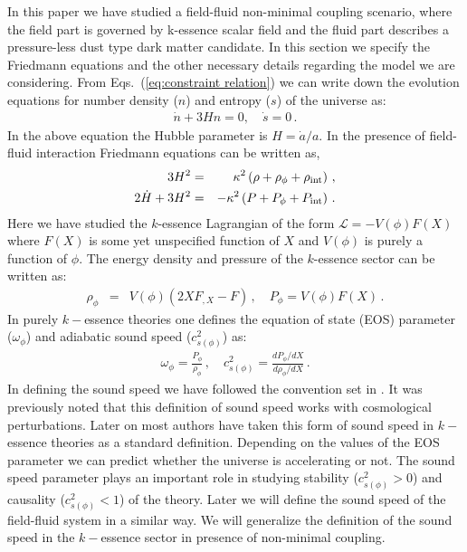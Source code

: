 \documentclass[a4paper,12pt]{article}
\begin{document}
In this paper we have studied a field-fluid non-minimal coupling scenario, where the field part is governed by k-essence scalar field and the fluid part describes a  pressure-less dust type dark matter candidate.  In this section we specify the Friedmann equations and the other necessary details regarding the model we are considering. From Eqs.~(\ref{eq:constraint relation}) we can write down the evolution equations for number density ($n$) and entropy ($s$) of the universe as:
%
\begin{eqnarray}
\dot{n}+3Hn = 0,\quad  \dot{s}=0\,.
\end{eqnarray}
%
In the above equation the Hubble parameter is $H=\dot{a}/a$. In the presence of field-fluid interaction Friedmann equations can be written as,
\begin{eqnarray}
  3H^2 &=& \kappa^2 \left(\rho+\rho_{\phi}+\rho_{\rm int}\right)\,,
\label{frd1}\\
2\dot{H}+3H^2 &=& -\kappa^2 \left(P+P_{\phi}+P_{\rm int}\right)\,.
\label{eq:F1}
\end{eqnarray}
%
Here we have studied the $k$-essence Lagrangian of the form  ${\mathcal L}=-V(\phi)F(X)$ where $F(X)$ is some yet unspecified function of $X$ and $V(\phi)$ is purely a function of $\phi$. The energy density and pressure of the $k$-essence sector can be written as:
\begin{eqnarray}
\rho_{\phi} &=& V(\phi)(2XF_{,X}-F)\,,\quad P_{\phi}=V(\phi)F(X)\,.
\label{eq:F2}
\end{eqnarray}
%
In purely $k-$essence theories one defines the equation of state (EOS) parameter ($\omega_\phi$) and adiabatic sound speed ($c_{s(\phi)}^2$) as:
\begin{eqnarray}
\omega_\phi = \frac{P_{\phi}}{\rho_{\phi}}\,,\quad c_{s(\phi)}^2 = \frac{dP_\phi/dX}{d\rho_\phi/dX}\,.
\label{eq:F3}
\end{eqnarray}
%
In defining the sound speed we have followed the convention set in \cite{Garriga:1999vw, Scherrer:2004au}. It was previously noted that this definition of sound speed works with cosmological perturbations. Later on most authors have taken this form of sound speed in $k-$essence theories as a standard definition. Depending on the values of the EOS parameter we can predict whether the universe is accelerating or not. The sound speed parameter plays an important role in studying stability ($c_{s(\phi)}^2>0$) and causality ($c_{s(\phi)}^2<1$) of the theory. Later we will define the sound speed of the field-fluid system in a similar way. We will generalize the definition of the sound speed in the $k-$essence sector in presence of non-minimal coupling.
	
\end{document}
